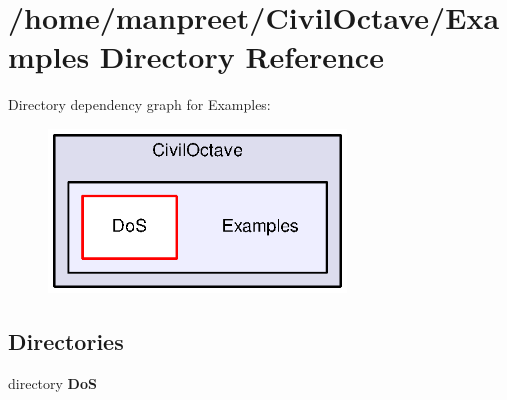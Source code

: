 \section{/home/manpreet/\-Civil\-Octave/\-Examples Directory Reference}
\label{dir_62a887078d1b89a7b01fc501ae98f9e6}
Directory dependency graph for Examples\-:
\nopagebreak
\begin{figure}[H]
\begin{center}
\leavevmode
\includegraphics[width=224pt]{dir_62a887078d1b89a7b01fc501ae98f9e6_dep}
\end{center}
\end{figure}
\subsection*{Directories}
\begin{DoxyCompactItemize}
\item 
directory {\bf Do\-S}
\end{DoxyCompactItemize}
